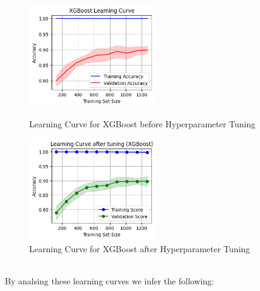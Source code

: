 \documentclass[12pt]{report}
\begin{document}
\begin{figure}[H]
	\centering
	\begin{minipage}{0.45\textwidth}
			\centering
			\includegraphics[height=12em]{lc_XG.png}
			\caption{Learning Curve for XGBoost before Hyperparameter Tuning}
			\label{lc_XG}
	\end{minipage}
	\hfill
	\begin{minipage}{0.45\textwidth}
			\centering
			\includegraphics[height=12em]{lc_tuned_XG.png}
			\caption{Learning Curve for XGBoost after Hyperparameter Tuning}
			\label{lc_tuned_XG}
	\end{minipage}
\end{figure}
$ $ \\
By analsing these learning curves we infer the following:
\vspace{-1.25em}
\end{document}
